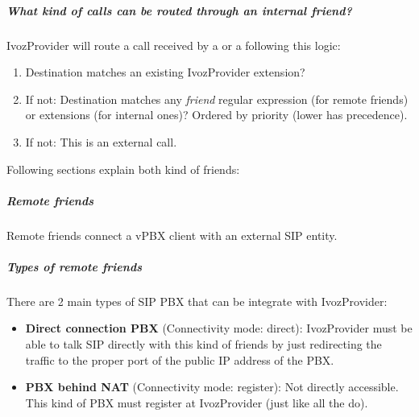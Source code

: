 \documentclass[letterpaper,10pt,english]{sphinxmanual}
\begin{document}
\subparagraph{What kind of calls can be routed through an \emph{internal friend}?}
\label{administration_portal/client/vpbx/routing_endpoints/friends/index:what-kind-of-calls-can-be-routed-through-an-internal-friend}
IvozProvider will route a call received by a {\hyperref[administration_portal/client/vpbx/users:users]{}} or a {\hyperref[administration_portal/client/vpbx/routing_endpoints/friends/index:friends]{}} following this logic:
\begin{enumerate}
\item {} 
Destination matches an existing IvozProvider extension?

\item {} 
If not: Destination matches any \emph{friend} regular expression (for remote friends) or extensions (for internal ones)? Ordered by priority (lower has precedence).

\item {} 
If not: This is an external call.

\end{enumerate}

Following sections explain both kind of friends:


\subparagraph{Remote friends}
\label{administration_portal/client/vpbx/routing_endpoints/friends/remote_friends:remote-friends}\label{administration_portal/client/vpbx/routing_endpoints/friends/remote_friends::doc}
Remote friends connect a vPBX client with an external SIP entity.


\subparagraph{Types of remote friends}
\label{administration_portal/client/vpbx/routing_endpoints/friends/remote_friends:types-of-remote-friends}
There are 2 main types of SIP PBX that can be integrate with IvozProvider:
\begin{itemize}
\item {} 
\textbf{Direct connection PBX} (Connectivity mode: direct): IvozProvider must be able to talk SIP directly with
this kind of friends by just redirecting the traffic to the proper port of
the public IP address of the PBX.

\item {} 
\textbf{PBX behind NAT} (Connectivity mode: register): Not directly accessible. This kind of PBX must register at
IvozProvider (just like all the {\hyperref[administration_portal/client/vpbx/terminals:terminals]{}} do).

\end{itemize}
\end{document}
